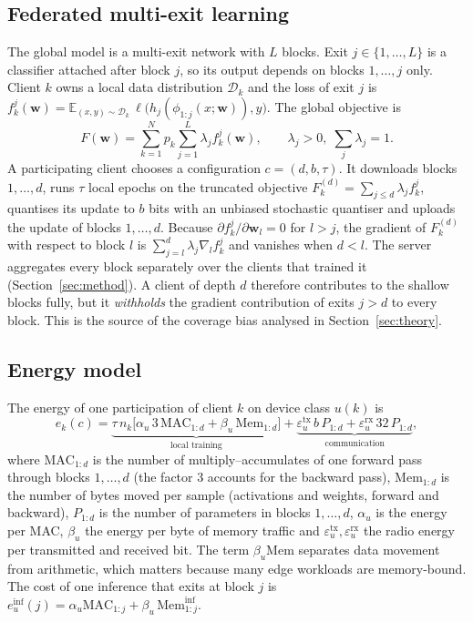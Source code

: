 \subsection{Federated multi-exit learning}
The global model is a multi-exit network with $L$ blocks. Exit $j\in\{1,\dots,L\}$ is a classifier attached after block $j$, so its output depends on blocks $1,\dots,j$ only. Client $k$ owns a local data distribution $\mathcal D_k$ and the loss of exit $j$ is $f_k^{j}(\mathbf w)=\mathbb E_{(x,y)\sim\mathcal D_k}\,\ell\big(h_j(\phi_{1:j}(x;\mathbf w)),y\big)$. The global objective is
\begin{equation}\label{eq:objective}
F(\mathbf w)=\sum_{k=1}^{N}p_k\sum_{j=1}^{L}\lambda_j f_k^{j}(\mathbf w),\qquad \lambda_j>0,\;\sum_j\lambda_j=1 .
\end{equation}
A participating client chooses a configuration $c=(d,b,\tau)$. It downloads blocks $1,\dots,d$, runs $\tau$ local epochs on the truncated objective $F_k^{(d)}=\sum_{j\le d}\lambda_j f_k^{j}$, quantises its update to $b$ bits with an unbiased stochastic quantiser and uploads the update of blocks $1,\dots,d$. Because $\partial f_k^{j}/\partial\mathbf w_l=0$ for $l>j$, the gradient of $F_k^{(d)}$ with respect to block $l$ is $\sum_{j=l}^{d}\lambda_j\nabla_l f_k^{j}$ and vanishes when $d<l$. The server aggregates every block separately over the clients that trained it (Section~\ref{sec:method}). A client of depth $d$ therefore contributes to the shallow blocks fully, but it \emph{withholds} the gradient contribution of exits $j>d$ to every block. This is the source of the coverage bias analysed in Section~\ref{sec:theory}.

\subsection{Energy model}\label{sec:energymodel}
The energy of one participation of client $k$ on device class $u(k)$ is
\begin{equation}\label{eq:ecomp}
e_k(c)=\underbrace{\tau\,n_k\Big[\alpha_u\,3\,\mathrm{MAC}_{1:d}+\beta_u\,\mathrm{Mem}_{1:d}\Big]}_{\text{local training}}
+\underbrace{\varepsilon^{\mathrm{tx}}_u\,b\,P_{1:d}+\varepsilon^{\mathrm{rx}}_u\,32\,P_{1:d}}_{\text{communication}} ,
\end{equation}
where $\mathrm{MAC}_{1:d}$ is the number of multiply--accumulates of one forward pass through blocks $1,\dots,d$ (the factor 3 accounts for the backward pass), $\mathrm{Mem}_{1:d}$ is the number of bytes moved per sample (activations and weights, forward and backward), $P_{1:d}$ is the number of parameters in blocks $1,\dots,d$, $\alpha_u$ is the energy per MAC, $\beta_u$ the energy per byte of memory traffic and $\varepsilon_u^{\mathrm{tx}},\varepsilon_u^{\mathrm{rx}}$ the radio energy per transmitted and received bit. The term $\beta_u\mathrm{Mem}$ separates data movement from arithmetic, which matters because many edge workloads are memory-bound. The cost of one inference that exits at block $j$ is $e^{\mathrm{inf}}_u(j)=\alpha_u\mathrm{MAC}_{1:j}+\beta_u\,\mathrm{Mem}^{\mathrm{inf}}_{1:j}$.

